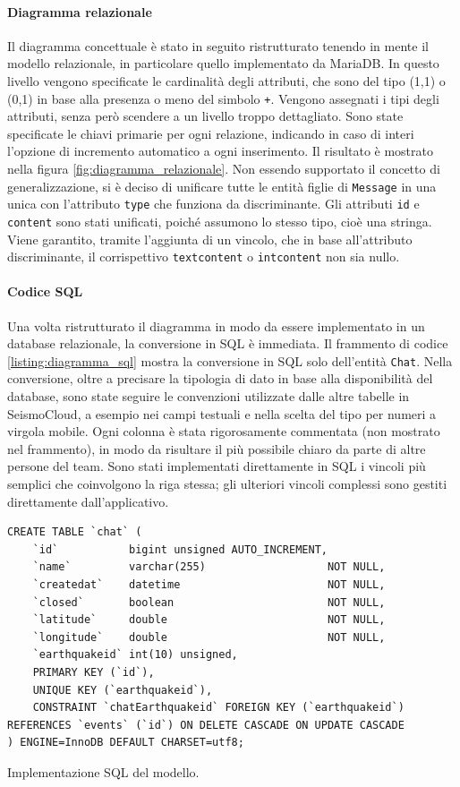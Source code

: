 \paragraph{Diagramma relazionale} Il diagramma concettuale è stato in seguito ristrutturato tenendo in mente il modello relazionale, in particolare quello implementato da MariaDB. In questo livello vengono specificate le cardinalità degli attributi, che sono del tipo (1,1) o (0,1) in base alla presenza o meno del simbolo \texttt{+}. Vengono assegnati i tipi degli attributi, senza però scendere a un livello troppo dettagliato. Sono state specificate le chiavi primarie per ogni relazione, indicando in caso di interi l'opzione di incremento automatico a ogni inserimento. Il risultato è mostrato nella figura \ref{fig:diagramma_relazionale}. Non essendo supportato il concetto di generalizzazione, si è deciso di unificare tutte le entità figlie di \texttt{Message} in una unica con l'attributo \texttt{type} che funziona da discriminante. Gli attributi \texttt{id} e \texttt{content} sono stati unificati, poiché assumono lo stesso tipo, cioè una stringa. Viene garantito, tramite l'aggiunta di un vincolo, che in base all'attributo discriminante, il corrispettivo \texttt{textcontent} o \texttt{intcontent} non sia nullo.

\paragraph{Codice SQL} Una volta ristrutturato il diagramma in modo da essere implementato in un database relazionale, la conversione in SQL è immediata. Il frammento di codice \ref{listing:diagramma_sql} mostra la conversione in SQL solo dell'entità \texttt{Chat}. Nella conversione, oltre a precisare la tipologia di dato in base alla disponibilità del database, sono state seguire le convenzioni utilizzate dalle altre tabelle in SeismoCloud, a esempio nei campi testuali e nella scelta del tipo per numeri a virgola mobile. Ogni colonna è stata rigorosamente commentata (non mostrato nel frammento), in modo da risultare il più possibile chiaro da parte di altre persone del team. Sono stati implementati direttamente in SQL i vincoli più semplici che coinvolgono la riga stessa; gli ulteriori vincoli complessi sono gestiti direttamente dall'applicativo.

\begin{listing}
\begin{verbatim}
CREATE TABLE `chat` (
    `id`           bigint unsigned AUTO_INCREMENT,
    `name`         varchar(255)                   NOT NULL,
    `createdat`    datetime                       NOT NULL,
    `closed`       boolean                        NOT NULL,
    `latitude`     double                         NOT NULL,
    `longitude`    double                         NOT NULL,
    `earthquakeid` int(10) unsigned,
    PRIMARY KEY (`id`),
    UNIQUE KEY (`earthquakeid`),
    CONSTRAINT `chatEarthquakeid` FOREIGN KEY (`earthquakeid`) REFERENCES `events` (`id`) ON DELETE CASCADE ON UPDATE CASCADE
) ENGINE=InnoDB DEFAULT CHARSET=utf8;
\end{verbatim}
\caption{Implementazione SQL del modello.}
\label{listing:diagramma_sql}
\end{listing}

